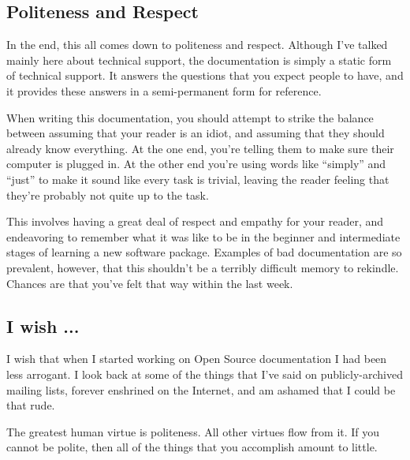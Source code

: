 \subsection*{Politeness and Respect}
In the end, this all comes down to politeness and respect. Although I’ve talked mainly here about technical support, the documentation is simply a static form of technical support. It answers the questions that you expect people to have, and it provides these answers in a semi-permanent form for reference.

When writing this documentation, you should attempt to strike the balance between assuming that your reader is an idiot, and assuming that they should already know everything. At the one end, you’re telling them to make sure their computer is plugged in. At the other end you’re using words like “simply” and “just” to make it sound like every task is trivial, leaving the reader feeling that they’re probably not quite up to the task.

This involves having a great deal of respect and empathy for your reader, and endeavoring to remember what it was like to be in the beginner and intermediate stages of learning a new software package. Examples of bad documentation are so prevalent, however, that this shouldn’t be a terribly difficult memory to rekindle. Chances are that you’ve felt that way within the last week.

\subsection*{I wish ...}
I wish that when I started working on Open Source documentation I had been less arrogant. I look back at some of the things that I’ve said on publicly-archived mailing lists, forever enshrined on the Internet, and am ashamed that I could be that rude.

The greatest human virtue is politeness. All other virtues flow from it. If you cannot be polite, then all of the things that you accomplish amount to little.
